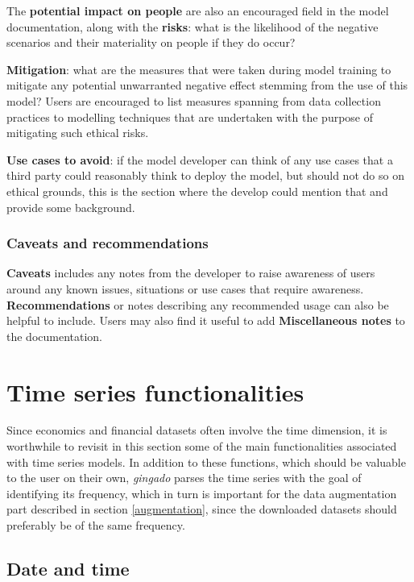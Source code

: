 \documentclass{article}
\begin{document}
The \textbf{potential impact on people} are also an encouraged field in the model documentation, along with the \textbf{risks}: what is the likelihood of the negative scenarios and their materiality on people if they do occur?

\textbf{Mitigation}: what are the measures that were taken during model training to mitigate any potential unwarranted negative effect stemming from the use of this model? Users are encouraged to list measures spanning from data collection practices to modelling techniques that are undertaken with the purpose of mitigating such ethical risks.

\textbf{Use cases to avoid}: if the model developer can think of any use cases that a third party could reasonably think to deploy the model, but should not do so on ethical grounds, this is the section where the develop could mention that and provide some background.

\subsubsection{Caveats and recommendations}

\textbf{Caveats} includes any notes from the developer to raise awareness of users around any known issues, situations or use cases that require awareness. \textbf{Recommendations} or notes describing any recommended usage can also be helpful to include. Users may also find it useful to add \textbf{Miscellaneous notes} to the documentation.

\section{Time series functionalities}

Since economics and financial datasets often involve the time dimension, it is worthwhile to revisit in this section some of the main functionalities associated with time series models. In addition to these functions, which should be valuable to the user on their own, \textit{gingado} parses the time series with the goal of identifying its frequency, which in turn is important for the data augmentation part described in section \ref{augmentation}, since the downloaded datasets should preferably be of the same frequency.


\subsection{Date and time}
\end{document}
